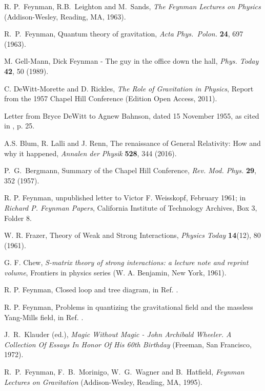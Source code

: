 \documentclass{ws-procs961x669}            %
\begin{document}
\begin{thebibliography}{10}

R. P.~Feynman, R.B.~Leighton and M.~Sands,
{\em The Feynman Lectures on Physics} (Addison-Wesley, Reading, MA, 1963).

R.~P.~Feynman, Quantum theory of gravitation, {\em Acta Phys.\ Polon.} {\bf 24}, 697 (1963).

M. Gell-Mann, Dick Feynman - The guy in the office down the hall, {\em Phys. Today} {\bf 42}, 50 (1989).

C. DeWitt-Morette and D. Rickles, {\em The Role of Gravitation in
Physics}, Report from the 1957 Chapel Hill Conference (Edition
Open Access, 2011).

Letter from Bryce DeWitt to Agnew Bahnson, dated 15 November 1955, as
cited in \cite{ChapelHill}, p. 25.

A.S. Blum, R. Lalli and J. Renn, The renaissance of General Relativity: How and why it happened,
{\em Annalen der Physik} {\bf 528}, 344 (2016).

P.~G.~Bergmann, Summary of the Chapel Hill Conference, {\em Rev. Mod. Phys.} {\bf 29}, 352 (1957).

R. P. Feynman, unpublished letter to Victor F. Weisskopf, February 1961; in  {\em Richard P. Feynman Papers}, California Institute of Technology Archives, Box 3, Folder 8.

W. R. Frazer, Theory of Weak and Strong Interactions, {\em Physics Today} {\bf 14}(12), 80 (1961).

 G. F. Chew, {\em S-matrix theory of strong interactions: a lecture note and reprint volume}, Frontiers in physics series (W. A. Benjamin, New York, 1961).

R. P. Feynman, Closed loop and tree diagram, in Ref.
\cite{Klauder:1972je}.

R. P. Feynman, Problems in quantizing the gravitational
field and the massless Yang-Mills field, in Ref.
\cite{Klauder:1972je}.

J.~R.~Klauder (ed.), {\em Magic Without Magic - John Archibald Wheeler. A Collection Of Essays In Honor Of His 60th Birthday} (Freeman, San Francisco, 1972).

R.~P.~Feynman, F.~B.~Morinigo, W.~G.~Wagner and B.~Hatfield, {\em Feynman Lectures on Gravitation} (Addison-Wesley, Reading, MA, 1995).


\end{thebibliography}
\end{document}
